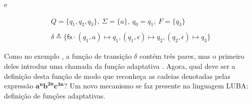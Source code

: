 \noindent e

	\begin{align*}
	Q = \{q_1, q_2, q_3\},\ \Sigma = \{a\},\ q_0 = q_1,\ F = \{q_3\} \\
	\\
	\delta \triangleq \{ \mathsf{fx}\cdot(q_1, a) \mapsto q_1,  (q_1, \epsilon) \mapsto q_2,  (q_2, \epsilon) \mapsto q_3 \} \tag{i}\label{d2-transicoes}
	\end{align*}

\noindent
Como no exemplo , a função de transição  $\delta$ contém três pares, mas o primeiro deles introduz uma chamada da função adaptativa . Agora, qual deve ser a definição desta função de modo que  reconheça as cadeias denotadas pelas expressão $\mathbf{a^nb^{2n}c^{3n}}$? Um novo mecanismo se faz presente na linguagem LUBA: definição de funções adaptativas.



